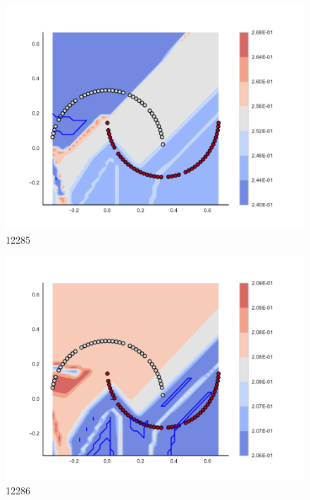 \begin{subfigure}[b]{0.09\textwidth}
    \includegraphics[clip, trim=2.35cm 1.75cm 4.5cm 0cm,width=\textwidth]{img/convergence/12285.pdf}
    \caption{12285}
    \label{fig:convergence_12285}
\end{subfigure}
%
\begin{subfigure}[b]{0.09\textwidth}
    \includegraphics[clip, trim=2.35cm 1.75cm 4.5cm 0cm,width=\textwidth]{img/convergence/12286.pdf}
    \caption{12286}
    \label{fig:convergence_12286}
\end{subfigure}
%
